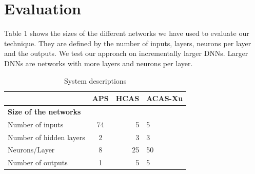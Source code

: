 \chapter{Evaluation}
Table 1 shows the sizes of the different networks we have used to evaluate our technique. They are defined by the number of inputs, layers, neurons per layer and the outputs. We test our approach on incrementally larger DNNs. Larger DNNs are networks with more layers and neurons per layer. %

\begin{table}[h!]
	\begin{center}
		\caption{System descriptions}
		\label{tab:table1}
		\begin{tabular}{l|S|r|l}
			\textbf{} & \textbf{APS} & \textbf{HCAS} & \textbf{ACAS-Xu} \\
			\hline
			\textbf{Size of the networks} &  &  &  \\
			Number of inputs &  74&   5&  5\\
			Number of hidden layers &  2&  3&  3\\
			Neurons/Layer &  8&  25 & 50 \\
			Number of outputs & 1&  5& 5\\
			\hline
			\hline
			
		\end{tabular}
	\end{center}
\end{table}


